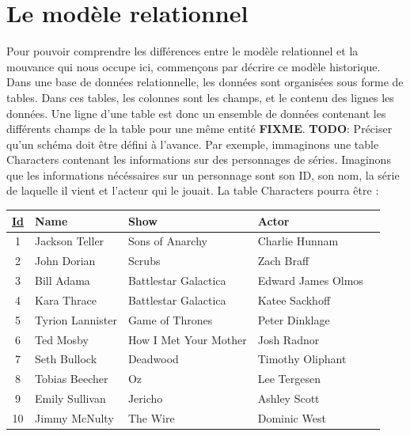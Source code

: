 \documentclass[11pt]{article}
\begin{document}
\section{Le modèle relationnel}
Pour pouvoir comprendre les différences entre le modèle relationnel et la mouvance qui nous occupe ici, commençons par décrire ce modèle historique. \\
Dans une base de données relationnelle, les données sont organisées sous forme de tables. Dans ces tables, les colonnes sont les champs, et le contenu des lignes les données. Une ligne d'une table est donc un ensemble de données contenant les différents champs de la table pour une même entité \colorbox{BrickRed}{\textbf{FIXME}}. \colorbox{BrickRed}{\textbf{TODO}: Préciser qu'un schéma doit être défini à l'avance.} Par exemple, immaginons une table Characters contenant les informations sur des personnages de séries. Imaginons que les informations nécéssaires sur un personnage sont son ID, son nom, la série de laquelle il vient et l'acteur qui le jouait. La table Characters pourra être : \\
\begin{center}
  \begin{tabular}{| c | l | l | l | l |}
    \hline
    \textbf{\underline{Id}} & \textbf{Name} & \textbf{Show} & \textbf{Actor} \\
    \hline
    \hline
    1 & Jackson Teller & Sons of Anarchy & Charlie Hunnam \\
    \hline
    2 & John Dorian & Scrubs & Zach Braff  \\
    \hline
    3 & Bill Adama & Battlestar Galactica & Edward James Olmos \\
    \hline
    4 & Kara Thrace & Battlestar Galactica & Katee Sackhoff \\
    \hline
    5 & Tyrion Lannister & Game of Thrones & Peter Dinklage \\
    \hline
    6 & Ted Mosby & How I Met Your Mother & Josh Radnor \\
    \hline
    7 & Seth Bullock & Deadwood & Timothy Oliphant \\
    \hline
    8 & Tobias Beecher & Oz & Lee Tergesen \\
    \hline
    9 & Emily Sullivan & Jericho & Ashley Scott \\
    \hline
    10 & Jimmy McNulty & The Wire & Dominic West \\
    \hline
  \end{tabular}
\end{center} 
\end{document}

